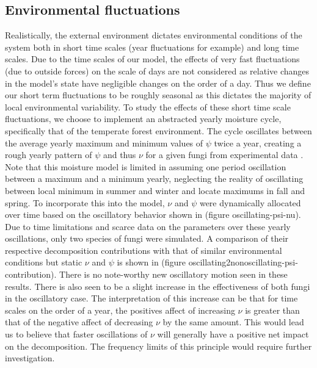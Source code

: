 \documentclass[10pt]{article}
\begin{document}
\subsection*{Environmental fluctuations}
Realistically, the external environment dictates environmental conditions of the system both in short time scales (year fluctuations for example) and long time scales. Due to the time scales of our model, the effects of very fast fluctuations (due to outside forces) on the scale of days are not considered as relative changes in the model's state have negligible changes on the order of a day. Thus we define our short term fluctuations to be roughly seasonal as this dictates the majority of local environmental variability. To study the effects of these short time scale fluctuations, we choose to implement an abstracted yearly moisture cycle, specifically that of the temperate forest environment. The cycle oscillates between the average yearly maximum and minimum values of $\psi$ twice a year, creating a rough yearly pattern of $\psi$ and thus $\nu$ for a given fungi from experimental data \cite{Zobel2001}\cite{Maynard2019}. Note that this moisture model is limited in assuming one period oscillation between a maximum and a minimum yearly, neglecting the reality of oscillating between local minimum in summer and winter and locate maximums in fall and spring. To incorporate this into the model, $\nu$ and $\psi$ were dynamically allocated over time based on the oscillatory behavior shown in (figure oscillating-psi-nu). Due to time limitations and scarce data on the parameters over these yearly oscillations, only two species of fungi were simulated. A comparison of their respective decomposition contributions with that of similar environmental conditions but static $\nu$ and $\psi$ is shown in (figure oscillating2nonoscillating-psi-contribution). There is no note-worthy new oscillatory motion seen in these results. There is also seen to be a slight increase in the effectiveness of both fungi in the oscillatory case. The interpretation of this increase can be that for time scales on the order of a year, the positives affect of increasing $\nu$ is greater than that of the negative affect of decreasing $\nu$ by the same amount. This would lead us to believe that faster oscillations of $\nu$ will generally have a positive net impact on the decomposition. The frequency limits of this principle would require further investigation. 
\end{document}

